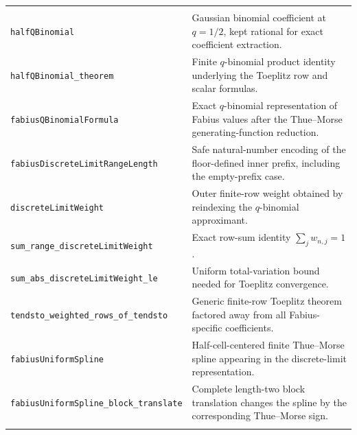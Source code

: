 \documentclass[11pt,a4paper,openany]{book}
\newcommand{\pathbreak}[1]{\nolinkurl{#1}}
\begin{document}
\begin{longtable}{@{}>{\raggedright\arraybackslash}p{}p{}@{}}
\multicolumn{2}{@{}l}{\sffamily\bfseries\color{OliveDark} $q$-binomial and discrete-limit machinery} \\
\addlinespace[.45em]
\pathbreak{halfQBinomial} & Gaussian binomial coefficient at $q=1/2$, kept rational for exact coefficient extraction. \\
\addlinespace[.28em]
\pathbreak{halfQBinomial_theorem} & Finite $q$-binomial product identity underlying the Toeplitz row and scalar formulas. \\
\addlinespace[.28em]
\pathbreak{fabiusQBinomialFormula} & Exact $q$-binomial representation of Fabius values after the Thue--Morse generating-function reduction. \\
\addlinespace[.28em]
\pathbreak{fabiusDiscreteLimitRangeLength} & Safe natural-number encoding of the floor-defined inner prefix, including the empty-prefix case. \\
\addlinespace[.28em]
\pathbreak{discreteLimitWeight} & Outer finite-row weight obtained by reindexing the $q$-binomial approximant. \\
\addlinespace[.28em]
\pathbreak{sum_range_discreteLimitWeight} & Exact row-sum identity $\sum_j w_{n,j}=1$. \\
\addlinespace[.28em]
\pathbreak{sum_abs_discreteLimitWeight_le} & Uniform total-variation bound needed for Toeplitz convergence. \\
\addlinespace[.28em]
\pathbreak{tendsto_weighted_rows_of_tendsto} & Generic finite-row Toeplitz theorem factored away from all Fabius-specific coefficients. \\
\addlinespace[.28em]
\pathbreak{fabiusUniformSpline} & Half-cell-centered finite Thue--Morse spline appearing in the discrete-limit representation. \\
\addlinespace[.28em]
\pathbreak{fabiusUniformSpline_block_translate} & Complete length-two block translation changes the spline by the corresponding Thue--Morse sign. \\
\addlinespace[.28em]


\end{longtable}
\end{document}
